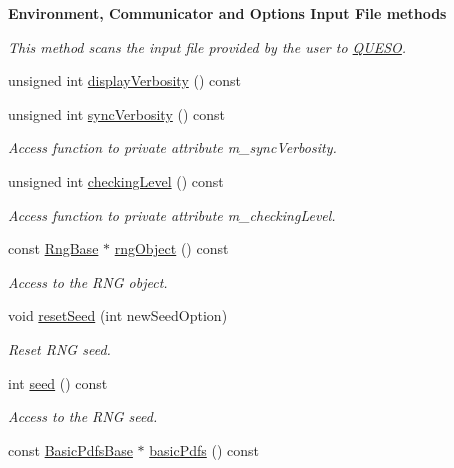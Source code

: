 \begin{Indent}{\bf Environment, Communicator and Options Input File methods}
\begin{DoxyCompactItemize}
\begin{DoxyCompactList}\small\item\em This method scans the input file provided by the user to \hyperlink{namespace_q_u_e_s_o}{Q\-U\-E\-S\-O}. \end{DoxyCompactList}\item 
unsigned int \hyperlink{class_q_u_e_s_o_1_1_base_environment_a1fe5f244fc0316a0ab3e37463f108b96}{display\-Verbosity} () const 
\item 
unsigned int \hyperlink{class_q_u_e_s_o_1_1_base_environment_a70df256cd4d968e426175a38269c04d5}{sync\-Verbosity} () const 
\begin{DoxyCompactList}\small\item\em Access function to private attribute m\-\_\-sync\-Verbosity. \end{DoxyCompactList}\item 
unsigned int \hyperlink{class_q_u_e_s_o_1_1_base_environment_a83c1c036f81651792a74975f2da23ae1}{checking\-Level} () const 
\begin{DoxyCompactList}\small\item\em Access function to private attribute m\-\_\-checking\-Level. \end{DoxyCompactList}\item 
const \hyperlink{class_q_u_e_s_o_1_1_rng_base}{Rng\-Base} $\ast$ \hyperlink{class_q_u_e_s_o_1_1_base_environment_afc1f1258b770ac8e27cf308bbcd6a296}{rng\-Object} () const 
\begin{DoxyCompactList}\small\item\em Access to the R\-N\-G object. \end{DoxyCompactList}\item 
void \hyperlink{class_q_u_e_s_o_1_1_base_environment_a32c3363d45d178108acca21f819a4dbf}{reset\-Seed} (int new\-Seed\-Option)
\begin{DoxyCompactList}\small\item\em Reset R\-N\-G seed. \end{DoxyCompactList}\item 
int \hyperlink{class_q_u_e_s_o_1_1_base_environment_addc0bff38872578f48d6fcd2f32ad08e}{seed} () const 
\begin{DoxyCompactList}\small\item\em Access to the R\-N\-G seed. \end{DoxyCompactList}\item 
const \hyperlink{class_q_u_e_s_o_1_1_basic_pdfs_base}{Basic\-Pdfs\-Base} $\ast$ \hyperlink{class_q_u_e_s_o_1_1_base_environment_af106da59f188ba0dbf4f93da3fcd8ca5}{basic\-Pdfs} () const 

\end{DoxyCompactItemize}
\end{Indent}
